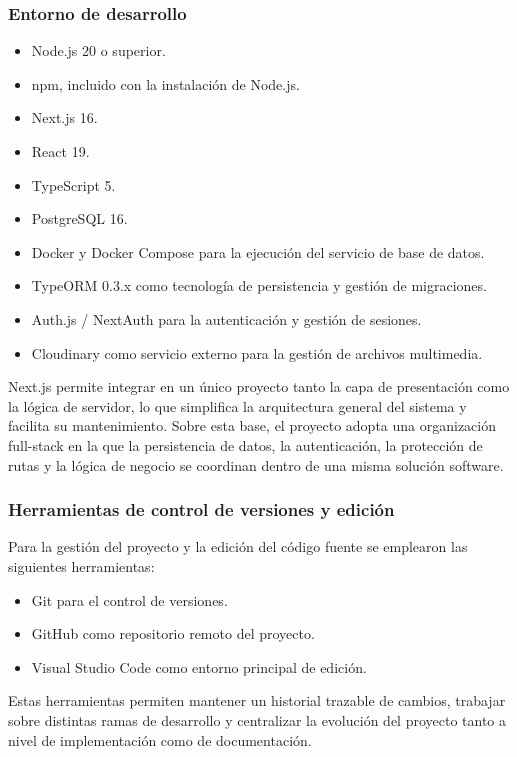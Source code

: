 \subsubsection*{Entorno de desarrollo}

\begin{itemize}
    \item Node.js 20 o superior.
    \item npm, incluido con la instalación de Node.js.
    \item Next.js 16.
    \item React 19.
    \item TypeScript 5.
    \item PostgreSQL 16.
    \item Docker y Docker Compose para la ejecución del servicio de base de datos.
    \item TypeORM 0.3.x como tecnología de persistencia y gestión de migraciones.
    \item Auth.js / NextAuth para la autenticación y gestión de sesiones.
    \item Cloudinary como servicio externo para la gestión de archivos multimedia.
\end{itemize}

Next.js permite integrar en un único proyecto tanto la capa de presentación como la lógica de servidor, lo que simplifica la arquitectura general del sistema y facilita su mantenimiento. Sobre esta base, el proyecto adopta una organización full-stack en la que la persistencia de datos, la autenticación, la protección de rutas y la lógica de negocio se coordinan dentro de una misma solución software.

\subsubsection*{Herramientas de control de versiones y edición}

Para la gestión del proyecto y la edición del código fuente se emplearon las siguientes herramientas:

\begin{itemize}
    \item Git para el control de versiones.
    \item GitHub como repositorio remoto del proyecto.
    \item Visual Studio Code como entorno principal de edición.
\end{itemize}

Estas herramientas permiten mantener un historial trazable de cambios, trabajar sobre distintas ramas de desarrollo y centralizar la evolución del proyecto tanto a nivel de implementación como de documentación.

